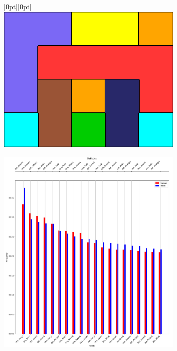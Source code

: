         \begin{figure}[H]
            \centering
            \begin{subfigure}[b]{0.45\textwidth}
                \centering
                \raisebox{0.8cm}[0pt][0pt]{\includegraphics[width=\textwidth]{images/cw-solution.png}}
                \caption{}
                \label{fig:cw-solution}
            \end{subfigure}
            \hspace{0.05\textwidth}
            \begin{subfigure}[b]{0.45\textwidth}
                \centering
                \includegraphics[width=\textwidth]{images/cw-stats.png}

\end{subfigure}
\end{figure}
